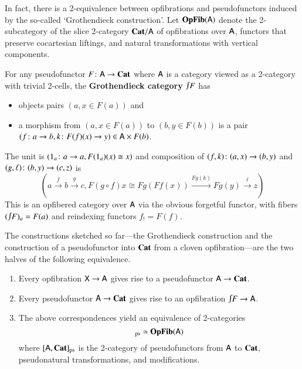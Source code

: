 \documentclass[reqno]{amsart}
\begin{document}
In fact, there is a 2-equivalence between opfibrations and pseudofunctors induced by the so-called `Grothendieck construction'.  Let $\mathbf{OpFib}(\mathsf{A})$ denote the 2-subcategory of the slice 2-category $\mathbf{Cat}/ \mathsf{A}$ of opfibrations over $\mathsf{A}$, functors that preserve cocartesian liftings, and natural transformations with vertical components.  
\begin{defn}\label{def:GrothCat}
For any pseudofunctor $F\colon\mathsf{A}\to\mathbf{Cat}$ where $\mathsf{A}$ is a category viewed as a 2-category with trivial 2-cells, the \textbf{Grothendieck category}
$\inta F$ has
\begin{itemize}
\item objects pairs $(a, x \in F(a))$ and
\item a morphism from $(a, x \in F(a))$ to $(b, y\in F(b))$ is a pair $(f \colon a \to b,k \colon F(f)(x) \to y)\in\mathsf{A}\times F(b)$.
\end{itemize}
The unit is $(1_a\colon a\to a,F(1_a)(x)\cong x)$ and composition of $(f,k)\colon(a,x)\to(b,y)$ and $(g,\ell)\colon(b,y)\to(c,z)$ is
\begin{equation}\label{eq:compGrothcat}
\left(a\xrightarrow{f}b\xrightarrow{g}c, F(g\circ f)x\cong Fg(Ff(x))\xrightarrow{Fg(k)}Fg(y)\xrightarrow{\ell}z\right) 
\end{equation}
This is an opfibered category over $\mathsf{A}$ via the obvious forgetful functor, with fibers $(\inta F)_a=F(a)$ and reindexing functors $f_!=F(f)$.
\end{defn}
The constructions sketched so far---the Grothendieck construction and the construction of a pseudofunctor into $\mathbf{Cat}$ from a cloven opfibration---are the two halves of the following equivalence.

\begin{thm}\label{thm:Grothendieck}\hfill
\begin{enumerate}
\item Every opfibration $\mathsf{X} \to \mathsf{A}$ gives rise to a pseudofunctor $\mathsf{A} \to \mathbf{Cat}$.
\item Every pseudofunctor $\mathsf{A} \to \mathbf{Cat}$ gives rise to an opfibration $\inta F \to\A$.
\item The above correspondences yield an equivalence of 2-categories 
\begin{displaymath}
[\A,\Cat]_\pse \simeq \OpFib(\A)
\end{displaymath}
where $[\mathsf{A},\mathbf{Cat}]_{\mathrm{ps}}$ is the 2-category of pseudofunctors from $\mathsf{A}$ to $\mathbf{Cat}$, pseudonatural transformations, and modifications.
\end{enumerate}
\end{thm}
\end{document}
